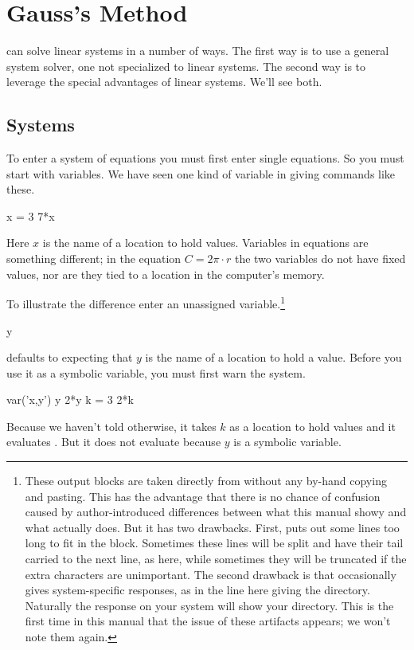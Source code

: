 \chapter{Gauss's Method}

\Sage{} can solve linear systems in a number of ways.
The first way is to use a general system solver, one not specialized to linear
systems.
The second way is to leverage the special advantages of linear systems.
We'll see both. 



\section{Systems}
To enter a system of equations you must first enter single equations.
So you must start with variables.
We have seen one kind of variable in giving commands like these.
\begin{sageoutput}
x = 3
7*x
\end{sageoutput}
Here $x$ is the name of a location to hold values.
Variables in equations are something different; in the equation
$C=2\pi\cdot r$ the two variables do not have fixed values, nor
are they tied to a location in the computer's memory. 

To illustrate the difference enter an unassigned 
variable.\footnote{These output blocks are taken directly from \protect\Sage{}
without any by-hand copying and pasting.
This has the advantage that 
there is no chance of confusion caused by author-introduced differences
between what this manual showy and what \protect\Sage{} actually does.
But it has two drawbacks.
First, \protect\Sage{} puts out some lines too long to fit in the block.
Sometimes these lines will be split and have their tail 
carried to the next line, as here, 
while sometimes they will be truncated if the extra characters are unimportant.
The second drawback is that \protect\Sage{} occasionally gives 
system-specific responses, as in the line here giving the directory.
Naturally the response on your system will show your directory.
This is the first time in this manual 
that the issue of these artifacts appears; we won't note them again.}
\begin{sageoutput}[s,1,71,67;s,2,70,66]
y
\end{sageoutput}
\noindent
\Sage{} defaults to expecting that
$y$ is the name of a location to hold a value.
Before you use it as a symbolic variable, you must first
warn the system.
\begin{sageoutput}
var('x,y')
y
2*y
k = 3
2*k
\end{sageoutput}
\noindent
Because we haven't told \Sage{} otherwise, it takes $k$ as a location to hold
values and it evaluates .
But it does not evaluate  because $y$ is a symbolic variable.

